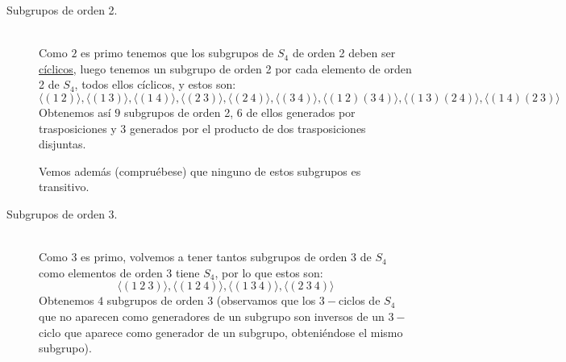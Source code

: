 \begin{description}
    \item [Subgrupos de orden 2.]~\\
        Como $2$ es primo tenemos que los subgrupos de $S_4$ de orden 2 deben ser \underline{cíclicos}, luego tenemos un subgrupo de orden 2 por cada elemento de orden 2 de $S_4$, todos ellos cíclicos, y estos son:
        \begin{equation*}
            \langle (1\ 2) \rangle , \langle (1\ 3) \rangle , \langle (1\ 4) \rangle , \langle (2\ 3) \rangle , \langle (2\ 4) \rangle , \langle (3\ 4) \rangle , \langle (1\ 2)(3\ 4) \rangle , \langle (1\ 3)(2\ 4) \rangle , \langle (1\ 4)(2\ 3) \rangle 
        \end{equation*}
        Obtenemos así $9$ subgrupos de orden 2, 6 de ellos generados por trasposiciones y 3 generados por el producto de dos trasposiciones disjuntas.

        Vemos además (compruébese) que ninguno de estos subgrupos es transitivo.
    \item [Subgrupos de orden 3.]~\\
        Como 3 es primo, volvemos a tener tantos subgrupos de orden 3 de $S_4$ como elementos de orden 3 tiene $S_4$, por lo que estos son:
        \begin{equation*}
            \langle (1\ 2\ 3) \rangle , \langle (1\ 2\ 4) \rangle , \langle (1\ 3\ 4) \rangle , \langle (2\ 3\ 4) \rangle 
        \end{equation*}
        Obtenemos $4$ subgrupos de orden 3 (observamos que los $3-$ciclos de $S_4$ que no aparecen como generadores de un subgrupo son inversos de un $3-$ciclo que aparece como generador de un subgrupo, obteniéndose el mismo subgrupo). 


\end{description}

